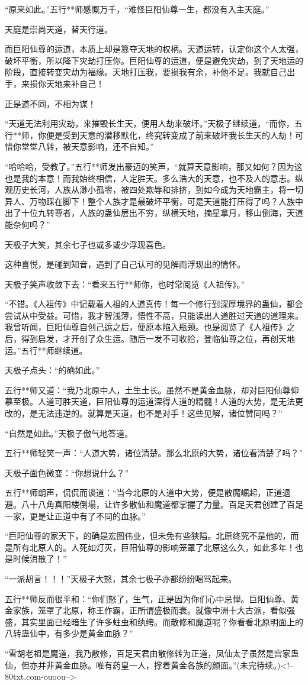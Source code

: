 \begin{this_body}
“原来如此。”五行**师感慨万千，“难怪巨阳仙尊一生，都没有入主天庭。”

天庭是崇尚天道，替天行道。

而巨阳仙尊的运道，本质上却是篡夺天地的权柄。天道运转，认定你这个人太强，破坏平衡，所以降下灾劫打压你。巨阳仙尊的运道，便是避免灾劫，到了天地运的阶段，直接转变灾劫为福缘。天地打压我，要损我有余，补他不足。我就自己出手，来损你天地来补自己！

正是道不同，不相为谋！

“天道无法利用灾劫，来摧毁长生天，便用人劫来破坏。”天极子继续道，“而你，五行**师，你便是受到天意的潜移默化，终究转变成了前来破坏我长生天的人劫！可惜你堂堂八转，被天意影响，还不自知。”

“哈哈哈，受教了。”五行**师发出豪迈的笑声，“就算天意影响，那又如何？因为这也是我的本意！而我始终相信，人定胜天。多么浩大的天意，也不及人的意志。纵观历史长河，人族从渺小孤零，被四处欺辱和排挤，到如今成为天地霸主，将一切异人、万物踩在脚下！整个人族才是最破坏平衡，可是天道能打压得了吗？人族中出了十位九转尊者，人族的蛊仙层出不穷，纵横天地，摘星拿月，移山倒海，天道能奈何吗？”

天极子大笑，其余七子也或多或少浮现喜色。

这种喜悦，是碰到知音，遇到了自己认可的见解而浮现出的情怀。

天极子笑声收敛下去：“看来五行**师你，也时常阅览《人祖传》。”

“不错。《人祖传》中记载着人祖的人道真传！每一个修行到深厚境界的蛊仙，都会尝试从中受益。可惜，我才智浅薄，悟性不高，只能读出人道胜过天道的道理来。我曾听闻，巨阳仙尊自创己运之后，便原本陷入瓶颈。也是阅览了《人祖传》之后，得到启发，才开创了众生运。随后一发不可收拾，登临仙尊之位，再创天地运。”五行**师继续道。

天极子点头：“的确如此。”

五行**师又道：“我乃北原中人，土生土长。虽然不是黄金血脉，却对巨阳仙尊仰慕至极。人道可胜天道，巨阳仙尊的运道深得人道的精髓！人道的大势，是无法更改的，是无法违逆的。就算是天道，也不是对手！这些见解，诸位赞同吗？”

“自然是如此。”天极子傲气地答道。

五行**师轻笑一声：“人道大势，诸位清楚。那么北原的大势，诸位看清楚了吗？”

天极子面色微变：“你想说什么？”

五行**师朗声，侃侃而谈道：“当今北原的人道中大势，便是散魔崛起，正道退避。八十八角真阳楼倒塌，让许多散仙和魔道都掌握了力量。百足天君创建了百足一家，更是让正道中有了不同的血脉。”

“巨阳仙尊的家天下，的确是宏图伟业，但未免有些狭隘。北原终究不是他的，而是所有北原人的。人死如灯灭，巨阳仙尊的影响笼罩了北原这么久，如此多年！也是时候消散了！”

“一派胡言！！！”天极子大怒，其余七极子亦都纷纷喝骂起来。

五行**师反而很平和：“你们怒了，生气，正是因为你们心中忌惮。巨阳仙尊、黄金家族，笼罩了北原，称王作霸，正所谓盛极而衰。就像中洲十大古派，看似强盛，其实里面已经暗生了许多蛀虫和纨绔。而散修和魔道呢？你看看北原明面上的八转蛊仙中，有多少是黄金血脉？”

“雪胡老祖是魔道，我乃散修，百足天君由散修转为正道，凤仙太子虽然是宫家蛊仙，但亦并非黄金血脉。唯有药皇一人，撑着黄金各族的颜面。”(未完待续。)<!--80txt.com-ouoou-->

\end{this_body}

